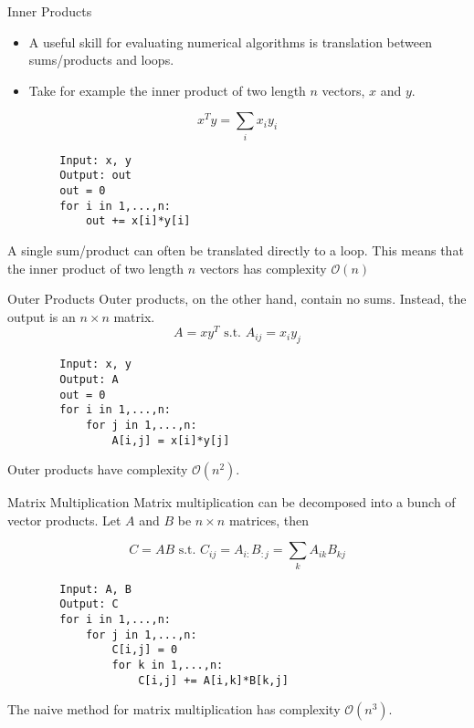 \documentclass[serif,xcolor=pdftex,dvipsnames,table,hyperref={bookmarks=false,breaklinks}]{beamer}
\begin{document}
\begin{frame}[t,fragile]{Inner Products}
	\begin{itemize}[<+->]
		\item A useful skill for evaluating numerical algorithms is translation between sums/products and loops. 
		\item Take for example the inner product of two length $n$ vectors, $x$ and $y$.
	\end{itemize}
	\pause
	$$x^Ty = \sum_i x_i y_i$$
	\pause
	\begin{lstlisting}
		Input: x, y
		Output: out
		out = 0
		for i in 1,...,n:
		    out += x[i]*y[i]
	\end{lstlisting}
	\pause
	A single sum/product can often be translated directly to a loop. This means that the inner product of two length $n$ vectors has complexity $\mathcal{O}(n)$
	
\end{frame}

\begin{frame}[t,fragile]{Outer Products}
	Outer products, on the other hand, contain no sums. Instead, the output is an $n\times n$ matrix.
	\pause
	$$A = xy^T \text{ s.t. } A_{ij} = x_i y_j$$
	\pause
	\begin{lstlisting}
		Input: x, y
		Output: A
		out = 0
		for i in 1,...,n:
		    for j in 1,...,n:
		        A[i,j] = x[i]*y[j]
	\end{lstlisting}
	\pause
	Outer products have complexity $\mathcal{O}(n^2)$.

\end{frame}

\begin{frame}[t,fragile]{Matrix Multiplication}
	Matrix multiplication can be decomposed into a bunch of vector products. Let $A$ and $B$ be $n \times n$ matrices, then
	
	\pause
	$$C = AB \text{ s.t. } C_{ij} = A_{i:} B_{:j} = \sum_k A_{ik}B_{kj}$$
	
	\pause
	\begin{lstlisting}
		Input: A, B
		Output: C
		for i in 1,...,n:
		    for j in 1,...,n:
		        C[i,j] = 0
		        for k in 1,...,n:
		            C[i,j] += A[i,k]*B[k,j]
	\end{lstlisting}

	\pause
	The naive method for matrix multiplication has complexity $\mathcal{O}(n^3)$.
\end{frame}
\end{document}
